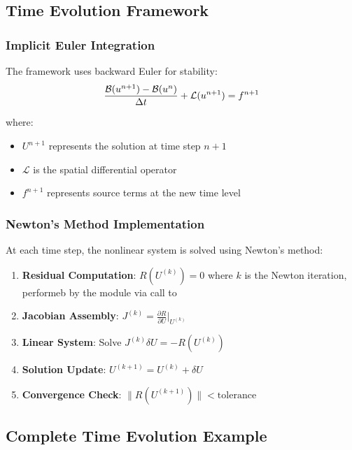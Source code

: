 \subsection{Time Evolution Framework}



\subsubsection{Implicit Euler Integration}
The framework uses backward Euler for stability: 
\begin{equation}
\frac{\mathcal{B} (u^{n+1}) - \mathcal{B} (u^n)}{\Delta t} + \mathcal{L}(u^{n+1}) = f^{n+1}
\end{equation}

where:
\begin{itemize}
    \item $U^{n+1}$ represents the solution at time step $n+1$
    \item $\mathcal{L}$ is the spatial differential operator
    \item $f^{n+1}$ represents source terms at the new time level
\end{itemize}

\subsubsection{Newton's Method Implementation}
At each time step, the nonlinear system is solved using Newton's method:
\begin{enumerate}
    \item \textbf{Residual Computation}: $R(U^{(k)}) = 0$ where $k$ is the Newton iteration, performeb by the  module via call to 
    \item \textbf{Jacobian Assembly}: $J^{(k)} = \frac{\partial R}{\partial U}\Big|_{U^{(k)}}$
    \item \textbf{Linear System}: Solve $J^{(k)} \delta U = -R(U^{(k)})$
    \item \textbf{Solution Update}: $U^{(k+1)} = U^{(k)} + \delta U$
    \item \textbf{Convergence Check}: $\|R(U^{(k+1)})\| < \text{tolerance}$
\end{enumerate}

\subsection{Complete Time Evolution Example}

